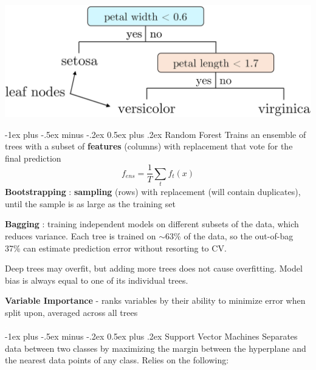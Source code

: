 \documentclass[10pt,landscape]{article}
\makeatletter
\renewcommand{\section}{\@startsection{section}{1}{0mm}%
                                {-1ex plus -.5ex minus -.2ex}%
                                {0.5ex plus .2ex}%
                                {\normalfont\large\bfseries}}
\renewcommand{\subsection}{\@startsection{subsection}{2}{0mm}%
                                {-1ex plus -.5ex minus -.2ex}%
                                {0.5ex plus .2ex}%
                                {\normalfont\normalsize\bfseries}}
\makeatother
\begin{document}
\begin{multicols}{3}
    \begin{center}\vspace{-1mm}
        \includegraphics[width=.9\linewidth]{CART.JPG}
    \end{center}


    \subsection{Random Forest}
    Trains an ensemble of trees with a subset of \textbf{features} (columns) with replacement that vote for the final prediction
    $$f_{ens}=\frac{1}{T} \sum_{t}f_t(x)$$
    \textbf{Bootstrapping} : \textbf{sampling} (rows) with replacement (will contain duplicates), until the sample is as large as the training set

    \textbf{Bagging} : training independent models on different subsets of the data, which reduces variance. Each tree is trained on $\sim$63\% of the data, so the out-of-bag 37\% can estimate prediction error without resorting to CV.

    Deep trees may overfit, but adding more trees does not cause overfitting. Model bias is always equal to one of its individual trees.

    \textbf{Variable Importance} - ranks variables by their ability to minimize error when split upon, averaged across all trees
    \\\textcolor{white}{.}\vspace{-5mm}\\ %

    \section{Support Vector Machines}
    Separates data between two classes by maximizing the margin between the hyperplane and the nearest data points of any class. Relies on the following:


\end{multicols}
\end{document}
